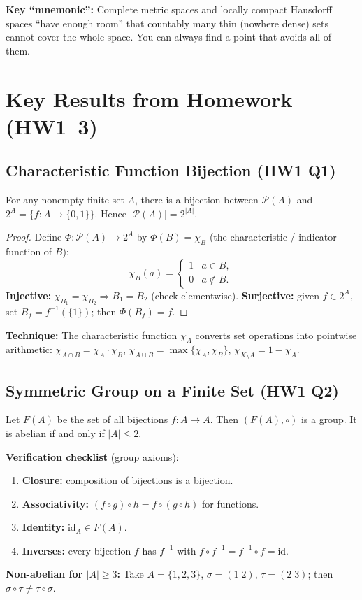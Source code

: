 \documentclass{article}
\begin{document}
\textbf{Key ``mnemonic'':} Complete metric spaces and locally compact
Hausdorff spaces ``have enough room'' that countably many thin (nowhere dense)
sets cannot cover the whole space. You can always find a point that avoids
all of them.

\section{Key Results from Homework (HW1--3)}

\subsection{Characteristic Function Bijection (HW1 Q1)}
\begin{theorem}
  For any nonempty finite set $A$, there is a bijection between
  $\mathcal{P}(A)$ and $2^A = \{f : A \to \{0,1\}\}$.
  Hence $|\mathcal{P}(A)| = 2^{|A|}$.
\end{theorem}
\begin{proof}
  Define $\Phi : \mathcal{P}(A) \to 2^A$ by
  $\Phi(B) = \chi_B$ (the characteristic / indicator function of $B$):
  \[
    \chi_B(a) =
    \begin{cases} 1 & a \in B, \\ 0 & a \notin B.
    \end{cases}
  \]
  \textbf{Injective:} $\chi_{B_1} = \chi_{B_2} \Rightarrow B_1 = B_2$
  (check elementwise). \textbf{Surjective:} given $f \in 2^A$, set
  $B_f = f^{-1}(\{1\})$; then $\Phi(B_f) = f$.
\end{proof}
\textbf{Technique:} The characteristic function $\chi_A$ converts set
operations into pointwise arithmetic: $\chi_{A \cap B} = \chi_A \cdot
\chi_B$, $\chi_{A \cup B} = \max\{\chi_A, \chi_B\}$,
$\chi_{X \setminus A} = 1 - \chi_A$.

\subsection{Symmetric Group on a Finite Set (HW1 Q2)}
\begin{proposition}
  Let $F(A)$ be the set of all bijections $f : A \to A$. Then
  $(F(A), \circ)$ is a group. It is abelian if and only if $|A| \le 2$.
\end{proposition}
\textbf{Verification checklist} (group axioms):
\begin{enumerate}
  \item \textbf{Closure:} composition of bijections is a bijection.
  \item \textbf{Associativity:} $(f \circ g) \circ h = f \circ (g \circ
    h)$ for functions.
  \item \textbf{Identity:} $\mathrm{id}_A \in F(A)$.
  \item \textbf{Inverses:} every bijection $f$ has $f^{-1}$ with
    $f \circ f^{-1} = f^{-1} \circ f = \mathrm{id}$.
\end{enumerate}
\textbf{Non-abelian for $|A| \ge 3$:} Take $A = \{1,2,3\}$, $\sigma =
(1\;2)$, $\tau = (2\;3)$; then $\sigma \circ \tau \ne \tau \circ
\sigma$.
\end{document}
